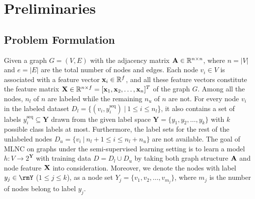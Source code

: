 \section{Preliminaries}  


\subsection{Problem Formulation} \label{sec:notions}
Given a graph \( G = (V, E) \) with the adjacency matrix \( \mathbf{A} \in \mathbb{R}^{n \times n} \), where \( n = |V| \) and \( e = |E| \) are the total number of nodes and edges. Each node \( v_i \in V \) is associated with a feature vector \( \mathbf{x}_i \in \mathbb{R}^f \), and all these feature vectors constitute the feature matrix \( \mathbf{X} \in \mathbb{R}^{n \times f} = [\mathbf{x}_1, \mathbf{x}_2, \ldots, \mathbf{x}_n]^T \) of the graph \( G \). 
Among all the nodes, \( n_l \) of \( n \) are labeled while the remaining \( n_u \) of \( n \) are not. 
For every node \( v_i \) in the labeled dataset \( D_l = \{ (v_i, y^{\text{seq}}_i) \ | \ 1 \leq i \leq n_l \)\}, it also contains a set of labels \( y^{\text{seq}}_i \subseteq \mathbf{Y} \) drawn from the given label space \( \mathbf{Y} = \{ y_1, y_2, \ldots, y_k \} \) with \( k \) possible class labels at most. Furthermore, the label sets for the rest of the unlabeled nodes \( D_u = \{ v_i \ | \ n_l + 1 \leq i \leq n_l + n_u \} \) are not available. The goal of MLNC on graphs under the semi-supervised learning setting is to learn a model \( h: V \rightarrow 2^\mathbf{Y} \) with training data \( D = D_l \cup D_u \) by taking both graph structure \( \mathbf{A} \) and node feature \( \mathbf{X} \) into consideration.
Moreover, we denote the nodes with label $y_j\in\rmY$ ($1 \leq j \leq k$), as a node set $Y_j = \{ v_1, v_2, \ldots, v_{m_j}\}$, where $m_j$ is the number of nodes belong to label $y_j$.

